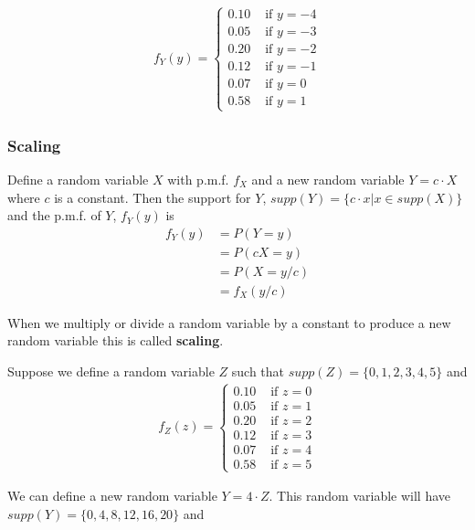 \begin{align}
    f_{Y}(y) = \begin{cases}
                0.10 & \text{ if } y=-4\\
                0.05 & \text{ if } y=-3\\
                0.20 & \text{ if } y=-2\\
                0.12 & \text{ if } y=-1\\
                0.07 & \text{ if } y=0\\
                0.58 & \text{ if } y=1
               \end{cases}
\end{align}


\subsubsection{Scaling}

Define a random variable $X$ with p.m.f. $f_{X}$ and a new random variable $Y = c \cdot X$ where $c$ is a constant. Then the support for $Y$, $supp(Y) = \{ c \cdot x | x \in supp(X) \}$ and the p.m.f. of $Y$, $f_{Y}(y)$ is 
\begin{align}
    f_{Y}(y) &= P(Y=y) \\ 
     &= P(cX = y)\\ 
     &= P(X=y/c)\\
     &= f_{X}(y/c)
\end{align}

When we multiply or divide a random variable by a constant to produce a new random variable this is called \textbf{scaling}.

\ex Suppose we define a random variable $Z$ such that $supp(Z) = \{0,1,2,3,4,5\}$ and 
\begin{align}
    f_{Z}(z) = \begin{cases}
                0.10 & \text{ if } z=0\\
                0.05 & \text{ if } z=1\\
                0.20 & \text{ if } z=2\\
                0.12 & \text{ if } z=3\\
                0.07 & \text{ if } z=4\\
                0.58 & \text{ if } z=5
               \end{cases}
\end{align}

We can define a new random variable $Y = 4 \cdot Z$.
This random variable will have $supp(Y) =\{0,4,8,12,16,20\}$ and 

